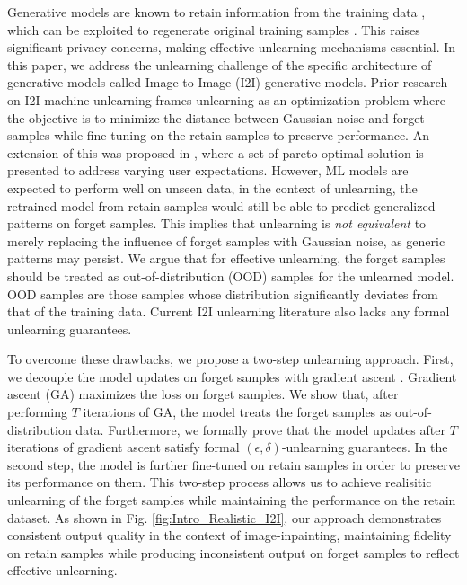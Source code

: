 Generative models are known to retain information from the training data \cite{somepalli2023diffusion}, which can be exploited to regenerate original training samples \cite{carlini2023extracting}.  This raises significant privacy concerns, making effective unlearning mechanisms essential. In this paper, we address the unlearning challenge of the specific architecture of generative models called Image-to-Image (I2I) generative models. Prior research on I2I machine unlearning \cite{li2024machine} frames unlearning as an optimization problem where the objective is to minimize the distance between Gaussian noise and forget samples while fine-tuning on the retain samples to preserve performance. An extension of this was proposed in \cite{feng2024controllable}, where a set of pareto-optimal solution is presented to address varying user expectations. However, ML models are expected to perform well on unseen data, in the context of unlearning, the retrained model from retain samples would still be able to predict generalized patterns on forget samples. This implies that unlearning is \textit{not equivalent} to merely replacing the influence of forget samples with Gaussian noise, as generic patterns may persist. We argue that for effective unlearning, the forget samples should be treated as out-of-distribution (OOD) samples for the unlearned model. OOD samples are those samples whose distribution significantly deviates from that of the training data. Current I2I unlearning literature \cite{li2024machine, feng2024controllable} also lacks any formal unlearning guarantees. 

To overcome these drawbacks, we propose a two-step unlearning approach. First, we decouple the model updates on forget samples with gradient ascent \cite{halimi2022federated}. Gradient ascent (GA) maximizes the loss on forget samples. We show that, after performing $T$ iterations of GA, the model treats the forget samples as out-of-distribution data. Furthermore, we formally prove that the model updates after $T$ iterations of gradient ascent satisfy formal $(\epsilon, \delta)$-unlearning guarantees. In the second step, the model is further fine-tuned on retain samples in order to preserve its performance on them. This two-step process allows us to achieve realisitic unlearning of the forget samples while maintaining the performance on the retain dataset. As shown in Fig. \ref{fig:Intro_Realistic_I2I}, our approach demonstrates consistent output quality in the context of image-inpainting, maintaining fidelity on retain samples while producing inconsistent output on forget samples to reflect effective unlearning.

